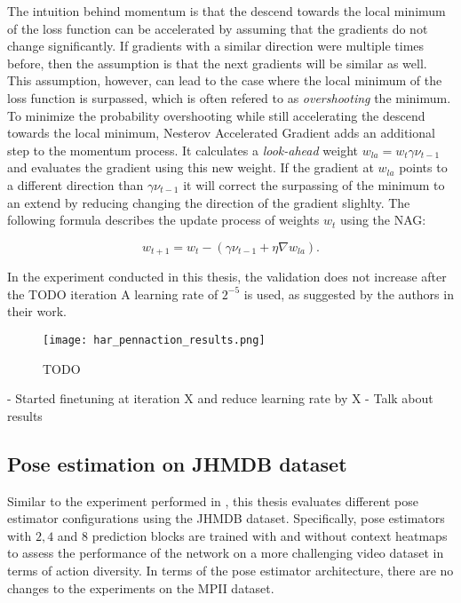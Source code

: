 The intuition behind momentum is that the descend towards the local minimum of the loss function can be accelerated by assuming that the gradients do not change significantly.
If gradients with a similar direction were multiple times before, then the assumption is that the next gradients will be similar as well.
This assumption, however, can lead to the case where the local minimum of the loss function is surpassed, which is often refered to as \textit{overshooting} the minimum.
To minimize the probability overshooting while still accelerating the descend towards the local minimum, Nesterov Accelerated Gradient adds an additional step to the momentum process.
It calculates a \textit{look-ahead} weight $w_{la} = w_{t} \gamma \nu_{t-1}$ and evaluates the gradient using this new weight.
If the gradient at $w_{la}$ points to a different direction than $\gamma \nu_{t-1}$ it will correct the surpassing of the minimum to an extend by reducing changing the direction of the gradient slighlty.
The following formula describes the update process of weights $w_t$ using the NAG:

\begin{equation}
    w_{t+1} = w_t - (\gamma \nu_{t-1} + \eta \nabla w_{la}).
\end{equation}

In the experiment conducted in this thesis, the validation does not increase after the TODO iteration
A learning rate of $2^{-5}$ is used, as suggested by the authors in their work.

\begin{figure}[htb!]
    \centering
    \texttt{[image: har\_pennaction\_results.png]}
    \caption{TODO}
    \label{fig:har_pennaction_results}
\end{figure}

- Started finetuning at iteration X and reduce learning rate by X %
- Talk about results

\subsection{Pose estimation on JHMDB dataset}
\label{sec:exp-pose-jhmdb}
Similar to the experiment performed in , this thesis evaluates different pose estimator configurations using the JHMDB dataset.
Specifically, pose estimators with $2, 4$ and $8$ prediction blocks are trained with and without context heatmaps to assess the performance of the network on a more challenging video dataset in terms of action diversity.
In terms of the pose estimator architecture, there are no changes to the experiments on the MPII dataset.

